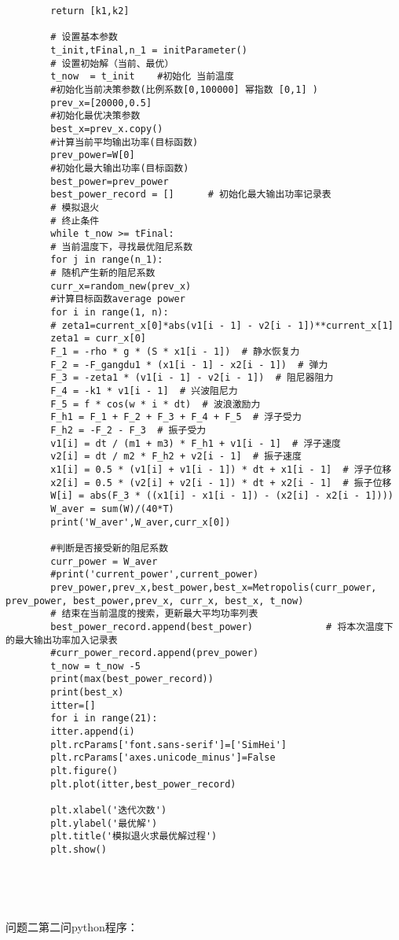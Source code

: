 \documentclass[a4paper,12pt]{article}
\begin{document}
\begin{lstlisting}
		return [k1,k2]
		
		# 设置基本参数
		t_init,tFinal,n_1 = initParameter()
		# 设置初始解（当前、最优）
		t_now  = t_init    #初始化 当前温度
		#初始化当前决策参数(比例系数[0,100000] 幂指数 [0,1] )
		prev_x=[20000,0.5]
		#初始化最优决策参数
		best_x=prev_x.copy()
		#计算当前平均输出功率(目标函数)
		prev_power=W[0]
		#初始化最大输出功率(目标函数)
		best_power=prev_power
		best_power_record = []      # 初始化最大输出功率记录表
		# 模拟退火
		# 终止条件
		while t_now >= tFinal:
		# 当前温度下，寻找最优阻尼系数
		for j in range(n_1):
		# 随机产生新的阻尼系数
		curr_x=random_new(prev_x)
		#计算目标函数average power
		for i in range(1, n):
		# zeta1=current_x[0]*abs(v1[i - 1] - v2[i - 1])**current_x[1]
		zeta1 = curr_x[0]
		F_1 = -rho * g * (S * x1[i - 1])  # 静水恢复力
		F_2 = -F_gangdu1 * (x1[i - 1] - x2[i - 1])  # 弹力
		F_3 = -zeta1 * (v1[i - 1] - v2[i - 1])  # 阻尼器阻力
		F_4 = -k1 * v1[i - 1]  # 兴波阻尼力
		F_5 = f * cos(w * i * dt)  # 波浪激励力
		F_h1 = F_1 + F_2 + F_3 + F_4 + F_5  # 浮子受力
		F_h2 = -F_2 - F_3  # 振子受力
		v1[i] = dt / (m1 + m3) * F_h1 + v1[i - 1]  # 浮子速度
		v2[i] = dt / m2 * F_h2 + v2[i - 1]  # 振子速度
		x1[i] = 0.5 * (v1[i] + v1[i - 1]) * dt + x1[i - 1]  # 浮子位移
		x2[i] = 0.5 * (v2[i] + v2[i - 1]) * dt + x2[i - 1]  # 振子位移
		W[i] = abs(F_3 * ((x1[i] - x1[i - 1]) - (x2[i] - x2[i - 1])))
		W_aver = sum(W)/(40*T)
		print('W_aver',W_aver,curr_x[0])
		
		#判断是否接受新的阻尼系数
		curr_power = W_aver
		#print('current_power',current_power)
		prev_power,prev_x,best_power,best_x=Metropolis(curr_power, prev_power, best_power,prev_x, curr_x, best_x, t_now)
		# 结束在当前温度的搜索，更新最大平均功率列表
		best_power_record.append(best_power)             # 将本次温度下的最大输出功率加入记录表
		#curr_power_record.append(prev_power)
		t_now = t_now -5
		print(max(best_power_record))
		print(best_x)
		itter=[]
		for i in range(21):
		itter.append(i)
		plt.rcParams['font.sans-serif']=['SimHei']
		plt.rcParams['axes.unicode_minus']=False
		plt.figure()
		plt.plot(itter,best_power_record)
		
		plt.xlabel('迭代次数')
		plt.ylabel('最优解')
		plt.title('模拟退火求最优解过程')
		plt.show()
		
		
		
		
	\end{lstlisting}
	问题二第二问python程序：
\end{document}
